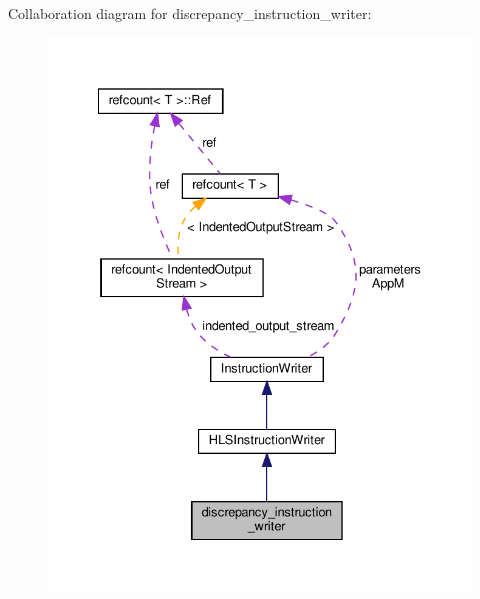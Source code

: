 Collaboration diagram for discrepancy\+\_\+instruction\+\_\+writer\+:
\nopagebreak
\begin{figure}[H]
\begin{center}
\leavevmode
\includegraphics[width=335pt]{d2/dd3/classdiscrepancy__instruction__writer__coll__graph}
\end{center}
\end{figure}
